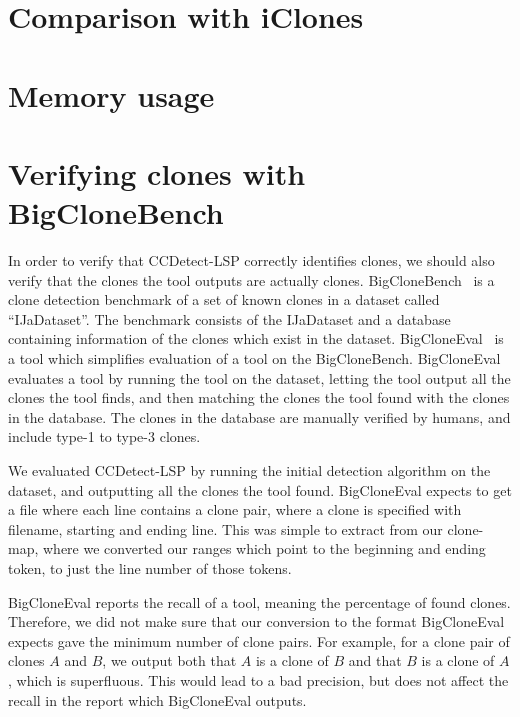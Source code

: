 

\section{Comparison with iClones}

\section{Memory usage}

\section{Verifying clones with BigCloneBench}

In order to verify that CCDetect-LSP correctly identifies clones, we should also verify
that the clones the tool outputs are actually clones. BigCloneBench~\cite{BigCloneBench}
is a clone detection benchmark of a set of known clones in a dataset called
``IJaDataset''. The benchmark consists of the IJaDataset and a database containing
information of the clones which exist in the dataset. BigCloneEval~\cite{BigCloneEval} is
a tool which simplifies evaluation of a tool on the BigCloneBench. BigCloneEval evaluates
a tool by running the tool on the dataset, letting the tool output all the clones the tool
finds, and then matching the clones the tool found with the clones in the database. The
clones in the database are manually verified by humans, and include type-1 to type-3
clones.

We evaluated CCDetect-LSP by running the initial detection algorithm on the dataset, and
outputting all the clones the tool found. BigCloneEval expects to get a file where each
line contains a clone pair, where a clone is specified with filename, starting and
ending line. This was simple to extract from our clone-map, where we converted our ranges
which point to the beginning and ending token, to just the line number of those tokens.

BigCloneEval reports the recall of a tool, meaning the percentage of found clones.
Therefore, we did not make sure that our conversion to the format BigCloneEval expects
gave the minimum number of clone pairs. For example, for a clone pair of clones $A$ and
$B$, we output both that $A$ is a clone of $B$ and that $B$ is a clone of $A$, which is
superfluous. This would lead to a bad precision, but does not affect the recall in the
report which BigCloneEval outputs.

